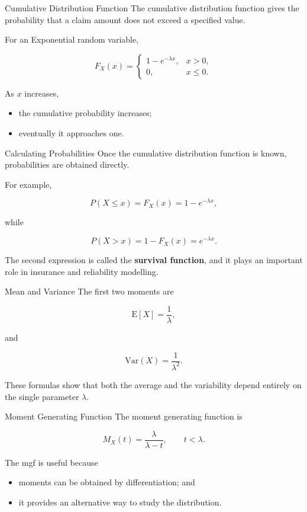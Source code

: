\documentclass[
  ignorenonframetext,
  aspectratio=169,
]{beamer}
\providecommand{\tightlist}{%
  \setlength{\itemsep}{0pt}\setlength{\parskip}{0pt}}
\begin{document}
\begin{frame}{Cumulative Distribution Function}
\protect{}\label{cumulative-distribution-function}
The cumulative distribution function gives the probability that a claim
amount does not exceed a specified value.

For an Exponential random variable,

\[
F_X(x)=
\begin{cases}
1-e^{-\lambda x}, & x>0,\\
0, & x\le0.
\end{cases}
\]

As \(x\) increases,

\begin{itemize}
\tightlist
\item
  the cumulative probability increases;
\item
  eventually it approaches one.
\end{itemize}
\end{frame}

\begin{frame}{Calculating Probabilities}
\protect{}\label{calculating-probabilities}
Once the cumulative distribution function is known, probabilities are
obtained directly.

For example,

\[
P(X\le x)=F_X(x)=1-e^{-\lambda x},
\]

while

\[
P(X>x)=1-F_X(x)=e^{-\lambda x}.
\]

The second expression is called the \textbf{survival function}, and it
plays an important role in insurance and reliability modelling.
\end{frame}

\begin{frame}{Mean and Variance}
\protect{}\label{mean-and-variance}
The first two moments are

\[
\mathrm{E}[X]=\frac1{\lambda},
\]

and

\[
\mathrm{Var}(X)=\frac1{\lambda^2}.
\]

These formulas show that both the average and the variability depend
entirely on the single parameter \(\lambda\).
\end{frame}

\begin{frame}{Moment Generating Function}
\protect{}\label{moment-generating-function}
The moment generating function is

\[
M_X(t)=
\frac{\lambda}{\lambda-t},
\qquad t<\lambda.
\]

The mgf is useful because

\begin{itemize}
\tightlist
\item
  moments can be obtained by differentiation; and
\item
  it provides an alternative way to study the distribution.
\end{itemize}
\end{frame}
\end{document}

